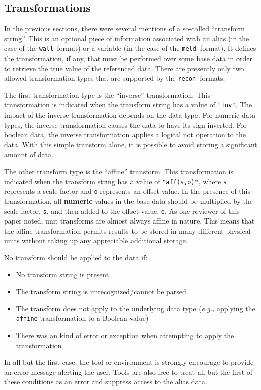 \documentclass[11pt,a4paper,twocolumn]{article}
\newcommand{\recon}{\texttt{recon}}
\newcommand{\wall}{\texttt{wall}}
\newcommand{\meld}{\texttt{meld}}
\newcommand{\code}[1]{\texttt{#1}} %
\begin{document}
\subsection{Transformations}
\label{sec:trans}


In the previous sections, there were several mentions of a so-called
``transform string''.  This is an optional piece of information
associated with an alias (in the case of the \wall\ format) or a
variable (in the case of the \meld\ format).  It defines the
transformation, if any, that must be performed over some base data in
order to retrieve the true value of the referenced data.  There are
presently only two allowed transformation types that are supported by
the \recon\ formats.

The first transformation type is the ``inverse'' transformation.  This
transformation is indicated when the transform string has a value of
\code{"inv"}.  The impact of the inverse transformation depends on the
data type.  For numeric data types, the inverse transformation causes
the data to have its sign inverted.  For boolean data, the inverse
transformation applies a logical not operation to the data.  With this
simple transform alone, it is possible to avoid storing a significant
amount of data.

The other transform type is the ``affine'' transform.  This
transformation is indicated when the transform string has a value of
\code{"aff(s,o)"}, where \code{s} represents a scale factor and
\code{o} represents an offset value.  In the presence of this
transformation, all \textbf{numeric} values in the base data should be
multiplied by the scale factor, \code{s}, and then added to the offset
value, \code{o}.  As one reviewer of this paper noted, unit transforms
are almost always affine in nature.  This means that the affine
transformation permits results to be stored in many different physical
units without taking up any appreciable additional storage.

No transform should be applied to the data if:
\begin{itemize}
\item No transform string is present
\item The transform string is unrecognized/cannot be parsed
\item The transform does not apply to the underlying data type
  (\textit{e.g.,} applying the \code{affine} transformation to a
  Boolean value)
\item There was an kind of error or exception when attempting to apply
  the transformation
\end{itemize}
In all but the first case, the tool or environment is strongly
encourage to provide an error message alerting the user.  Tools are
also free to treat all but the first of these conditions as an error
and suppress access to the alias data.
\end{document}
